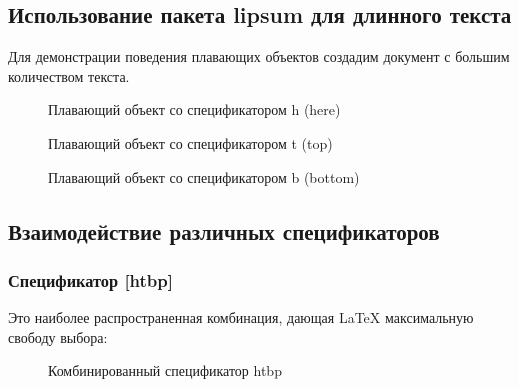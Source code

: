 \documentclass[12pt,a4paper]{article}
\begin{document}
\subsection{Использование пакета lipsum для длинного текста}

Для демонстрации поведения плавающих объектов создадим документ с большим количеством текста.

\lipsum[1]

\begin{figure}[h]
\centering
{}
\caption{Плавающий объект со спецификатором h (here)}
\label{fig:float_h}
\end{figure}

\lipsum[2]

\begin{figure}[t]
\centering
{}
\caption{Плавающий объект со спецификатором t (top)}
\label{fig:float_t}
\end{figure}

\lipsum[3]

\begin{figure}[b]
\centering
{}
\caption{Плавающий объект со спецификатором b (bottom)}
\label{fig:float_b}
\end{figure}

\lipsum[4]

\subsection{Взаимодействие различных спецификаторов}

\subsubsection{Спецификатор [htbp]}

Это наиболее распространенная комбинация, дающая LaTeX максимальную свободу выбора:
\begin{figure}[htbp]
\centering
{}
\caption{Комбинированный спецификатор htbp}
\label{fig:float_htbp}
\end{figure}
\end{document}
